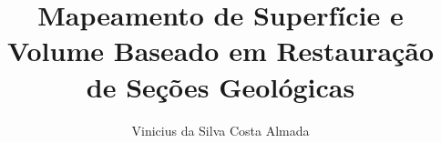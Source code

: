 \documentclass[
  master
  brazilian
]{ThesisPUC}
\author{Vinicius da Silva Costa Almada}
\title{Mapeamento de Superfície e Volume Baseado em Restauração de Seções Geológicas}
\begin{document}
  
  
  
  
  
  
  \arial
  
  \normalfont
\end{document}
